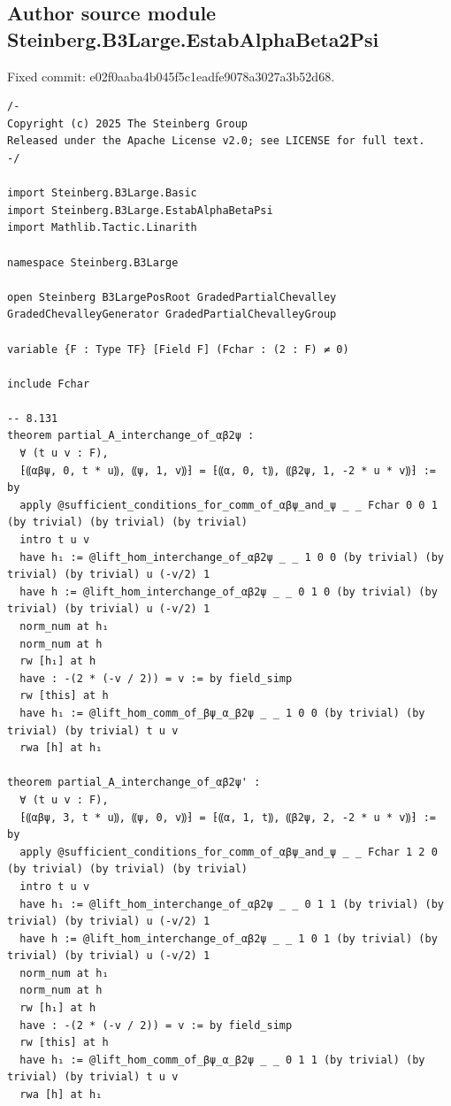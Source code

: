 \documentclass[10pt,a4paper]{article}
\begin{document}
\subsection*{Author source module Steinberg.B3Large.EstabAlphaBeta2Psi}
\noindent Fixed commit: e02f0aaba4b045f5c1eadfe9078a3027a3b52d68.
\begin{Verbatim}
/-
Copyright (c) 2025 The Steinberg Group
Released under the Apache License v2.0; see LICENSE for full text.
-/

import Steinberg.B3Large.Basic
import Steinberg.B3Large.EstabAlphaBetaPsi
import Mathlib.Tactic.Linarith

namespace Steinberg.B3Large

open Steinberg B3LargePosRoot GradedPartialChevalley GradedChevalleyGenerator GradedPartialChevalleyGroup

variable {F : Type TF} [Field F] (Fchar : (2 : F) ≠ 0)

include Fchar

-- 8.131
theorem partial_A_interchange_of_αβ2ψ :
  ∀ (t u v : F),
  ⁅⸨αβψ, 0, t * u⸩, ⸨ψ, 1, v⸩⁆ = ⁅⸨α, 0, t⸩, ⸨β2ψ, 1, -2 * u * v⸩⁆ := by
  apply @sufficient_conditions_for_comm_of_αβψ_and_ψ _ _ Fchar 0 0 1 (by trivial) (by trivial) (by trivial)
  intro t u v
  have h₁ := @lift_hom_interchange_of_αβ2ψ _ _ 1 0 0 (by trivial) (by trivial) (by trivial) u (-v/2) 1
  have h := @lift_hom_interchange_of_αβ2ψ _ _ 0 1 0 (by trivial) (by trivial) (by trivial) u (-v/2) 1
  norm_num at h₁
  norm_num at h
  rw [h₁] at h
  have : -(2 * (-v / 2)) = v := by field_simp
  rw [this] at h
  have h₁ := @lift_hom_comm_of_βψ_α_β2ψ _ _ 1 0 0 (by trivial) (by trivial) (by trivial) t u v
  rwa [h] at h₁

theorem partial_A_interchange_of_αβ2ψ' :
  ∀ (t u v : F),
  ⁅⸨αβψ, 3, t * u⸩, ⸨ψ, 0, v⸩⁆ = ⁅⸨α, 1, t⸩, ⸨β2ψ, 2, -2 * u * v⸩⁆ := by
  apply @sufficient_conditions_for_comm_of_αβψ_and_ψ _ _ Fchar 1 2 0 (by trivial) (by trivial) (by trivial)
  intro t u v
  have h₁ := @lift_hom_interchange_of_αβ2ψ _ _ 0 1 1 (by trivial) (by trivial) (by trivial) u (-v/2) 1
  have h := @lift_hom_interchange_of_αβ2ψ _ _ 1 0 1 (by trivial) (by trivial) (by trivial) u (-v/2) 1
  norm_num at h₁
  norm_num at h
  rw [h₁] at h
  have : -(2 * (-v / 2)) = v := by field_simp
  rw [this] at h
  have h₁ := @lift_hom_comm_of_βψ_α_β2ψ _ _ 0 1 1 (by trivial) (by trivial) (by trivial) t u v
  rwa [h] at h₁


\end{Verbatim}
\end{document}
